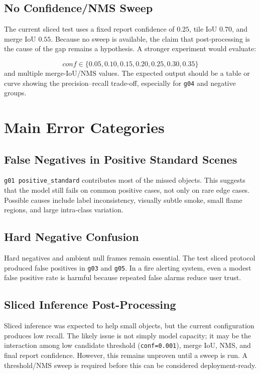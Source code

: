 \documentclass[12pt,a4paper]{report}
\newcommand{\code}[1]{\texttt{#1}}
\begin{document}
\subsection{No Confidence/NMS Sweep}
The current sliced test uses a fixed report confidence of \(0.25\), tile IoU \(0.70\), and merge IoU \(0.55\). Because no sweep is available, the claim that post-processing is the cause of the gap remains a hypothesis. A stronger experiment would evaluate:

\[
    conf \in \{0.05, 0.10, 0.15, 0.20, 0.25, 0.30, 0.35\}
\]
and multiple merge-IoU/NMS values. The expected output should be a table or curve showing the precision--recall trade-off, especially for \code{g04} and negative groups.

\section{Main Error Categories}
\subsection{False Negatives in Positive Standard Scenes}
\code{g01 positive\_standard} contributes most of the missed objects. This suggests that the model still fails on common positive cases, not only on rare edge cases. Possible causes include label inconsistency, visually subtle smoke, small flame regions, and large intra-class variation.

\subsection{Hard Negative Confusion}
Hard negatives and ambient null frames remain essential. The test sliced protocol produced false positives in \code{g03} and \code{g05}. In a fire alerting system, even a modest false positive rate is harmful because repeated false alarms reduce user trust.

\subsection{Sliced Inference Post-Processing}
Sliced inference was expected to help small objects, but the current configuration produces low recall. The likely issue is not simply model capacity; it may be the interaction among low candidate threshold (\code{conf=0.001}), merge IoU, NMS, and final report confidence. However, this remains unproven until a sweep is run. A threshold/NMS sweep is required before this can be considered deployment-ready.
\end{document}
